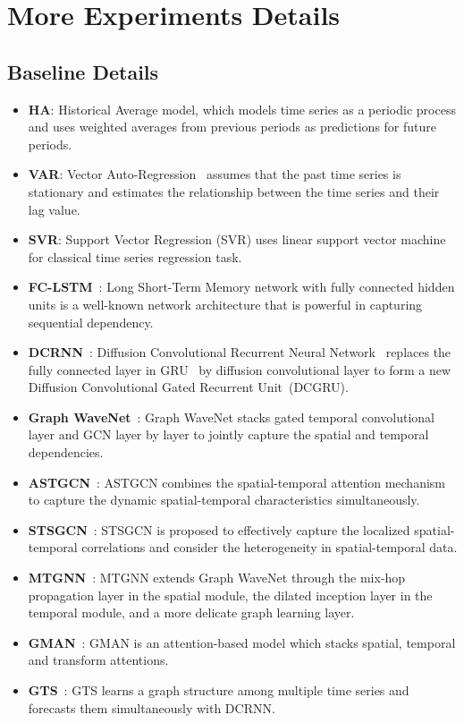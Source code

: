 \documentclass[sigconf]{acmart}
\begin{document}
\section{More Experiments Details}
\label{appendix_experiments}
\subsection{Baseline Details}
\label{appendix_basline}
\begin{itemize}
    \item \textbf{HA}: 
    Historical Average model, which models time series as a periodic process and uses weighted averages from previous periods as predictions for future periods.
    \item \textbf{VAR}: 
    Vector Auto-Regression~\cite{VAR, lutkepohl2005new} assumes that the past time series is stationary and estimates the relationship between the time series and their lag value.~\cite{2020STGNN}
    \item \textbf{SVR}: Support Vector Regression (SVR) uses linear support vector machine for classical time series regression task.
    \item \textbf{FC-LSTM}~\cite{2014Seq2Seq}: Long Short-Term Memory network with fully connected hidden units is a well-known network architecture that is powerful in capturing sequential dependency.
    \item \textbf{DCRNN}~\cite{2017DCRNN}: Diffusion Convolutional Recurrent Neural Network~\cite{2017DCRNN} replaces the fully connected layer in GRU~\cite{2014GRU} by diffusion convolutional layer to form a new Diffusion Convolutional Gated Recurrent Unit~(DCGRU).
    \item \textbf{Graph WaveNet}~\cite{GWNet}: Graph WaveNet stacks gated temporal convolutional layer and GCN layer by layer to jointly capture the spatial and temporal dependencies.
    \item \textbf{ASTGCN}~\cite{2019ASTGCN}: ASTGCN combines the spatial-temporal attention mechanism to capture the dynamic spatial-temporal characteristics simultaneously.
    \item \textbf{STSGCN}~\cite{2020STSGCN}: STSGCN is proposed to effectively capture the localized spatial-temporal correlations and consider the heterogeneity in spatial-temporal data.
    \item \textbf{MTGNN}~\cite{2020MTGNN}: MTGNN extends Graph WaveNet through the mix-hop propagation layer in the spatial module, the dilated inception layer in the temporal module, and a more delicate graph learning layer.
    \item \textbf{GMAN}~\cite{2020GMAN}: GMAN is an attention-based model which stacks spatial, temporal and transform attentions.
    \item \textbf{GTS}~\cite{2021GTS}: GTS learns a graph structure among multiple time series and forecasts them simultaneously with DCRNN. 
\end{itemize}
\end{document}
